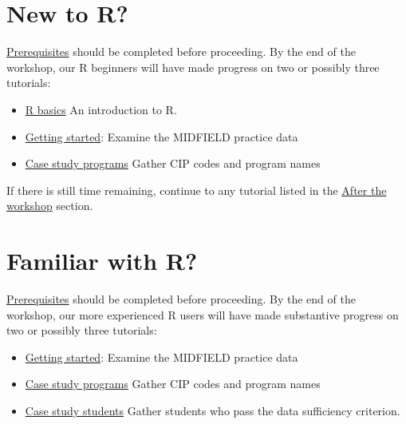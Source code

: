 \documentclass[
]{book}
\providecommand{\tightlist}{%
  \setlength{\itemsep}{0pt}\setlength{\parskip}{0pt}}
\begin{document}
\hypertarget{new-to-r}{%
\section{New to R?}\label{new-to-r}}

\protect\hyperlink{prerequisites}{Prerequisites} should be completed before proceeding. By the end of the workshop, our R beginners will have made progress on two or possibly three tutorials:

\begin{itemize}
\tightlist
\item
  \protect\hyperlink{R-basics}{R basics} An introduction to R.
\item
  \href{https://midfieldr.github.io/midfieldr/articles/art-000-getting-started.html}{Getting started}: Examine the MIDFIELD practice data\\
\item
  \href{https://midfieldr.github.io/midfieldr/articles/art-002-case-study-programs.html}{Case study programs} Gather CIP codes and program names
\end{itemize}

If there is still time remaining, continue to any tutorial listed in the \protect\hyperlink{after-the-workshop}{After the workshop} section.

\hypertarget{familiar-with-r}{%
\section{Familiar with R?}\label{familiar-with-r}}

\protect\hyperlink{prerequisites}{Prerequisites} should be completed before proceeding. By the end of the workshop, our more experienced R users will have made substantive progress on two or possibly three tutorials:

\begin{itemize}
\tightlist
\item
  \href{https://midfieldr.github.io/midfieldr/articles/art-000-getting-started.html}{Getting started}: Examine the MIDFIELD practice data\\
\item
  \href{https://midfieldr.github.io/midfieldr/articles/art-002-case-study-programs.html}{Case study programs} Gather CIP codes and program names
\item
  \href{https://midfieldr.github.io/midfieldr/articles/art-004-case-study-students.html}{Case study students} Gather students who pass the data sufficiency criterion.
\end{itemize}
\end{document}
